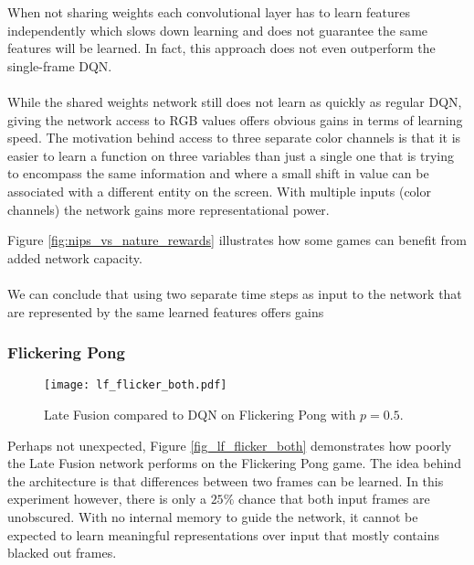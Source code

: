 When not sharing weights each convolutional layer
has to learn features independently which slows down learning
and does not guarantee the same features will be learned.
In fact, this approach does not even outperform
the single-frame DQN.

\paragraph{}
While  the shared weights network
still does not learn as quickly as regular DQN,
giving the network access to RGB values offers obvious gains
in terms of learning speed.
The motivation behind access to three separate color channels
is that it is easier to learn a function on three variables
than just a single one
that is trying to encompass the same information
and where a small shift in value can be associated
with a different entity on the screen.
With multiple inputs (color channels)
the network gains more representational power.

Figure \ref{fig:nips_vs_nature_rewards}
illustrates how some games can benefit
from added network capacity.

\paragraph{}
We can conclude that using two separate time steps
as input to the network
that are represented by the same learned features
offers gains

\subsubsection{Flickering Pong}

\begin{figure}[htpb]
  \centering
  \texttt{[image: lf\_flicker\_both.pdf]}
  \caption[Late Fusion Flickering Pong performance]{
    Late Fusion compared to DQN
    on Flickering Pong
    with $p=0.5$.
  }
  \label{fig:lf_flicker_both}
\end{figure}

Perhaps not unexpected,
Figure \ref{fig_lf_flicker_both}
demonstrates how poorly the Late Fusion network
performs on the Flickering Pong game.
The idea behind the architecture
is that differences between two frames can be learned.
In this experiment however,
there is only a $25\%$ chance
that both input frames are unobscured.
With no internal memory to guide the network,
it cannot be expected to learn meaningful representations
over input that mostly contains blacked out frames.

